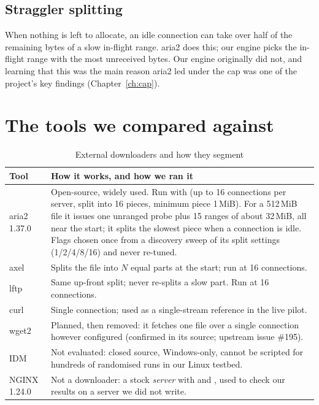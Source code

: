 \subsection{Straggler splitting}
When nothing is left to allocate, an idle connection can take over half of the remaining bytes of a slow in-flight range. aria2 does this; our engine picks the in-flight range with the most unreceived bytes. Our engine originally did not, and learning that this was the main reason aria2 led under the cap was one of the project's key findings (Chapter~\ref{ch:cap}).

\section{The tools we compared against}
\begin{table}[H]\centering\small
\caption{External downloaders and how they segment}\label{tab:tools}
\begin{tabularx}{\linewidth}{@{}lL@{}}
\toprule
\textbf{Tool} & \textbf{How it works, and how we ran it}\\
\midrule
aria2 1.37.0 & Open-source, widely used. Run with  (up to 16 connections per server, split into 16 pieces, minimum piece 1\,MiB). For a 512\,MiB file it issues one unranged probe plus 15 ranges of about 32\,MiB, all near the start; it splits the slowest piece when a connection is idle. Flags chosen once from a discovery sweep of its split settings (1/2/4/8/16) and never re-tuned.\\
axel & Splits the file into $N$ equal parts at the start; run at 16 connections.\\
lftp  & Same up-front split; never re-splits a slow part. Run at 16 connections.\\
curl & Single connection; used as a single-stream reference in the live pilot.\\
wget2 & Planned, then removed: it fetches one file over a single connection however configured (confirmed in its source; upstream issue \#195).\\
IDM & Not evaluated: closed source, Windows-only, cannot be scripted for hundreds of randomised runs in our Linux testbed.\\
NGINX 1.24.0 & Not a downloader: a stock \emph{server} with  and , used to check our results on a server we did not write.\\
\bottomrule
\end{tabularx}
\end{table}

